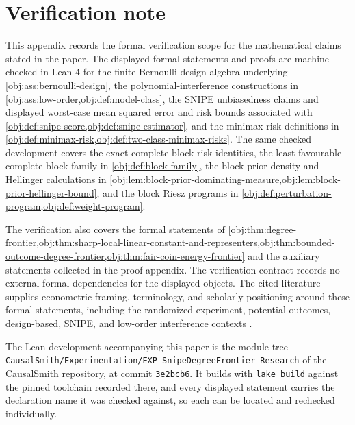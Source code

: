 \section{Verification note}

This appendix records the formal verification scope for the mathematical claims stated in the paper. The displayed formal statements and proofs are machine-checked in Lean 4 for the finite Bernoulli design algebra underlying \cref{obj:ass:bernoulli-design}, the polynomial-interference constructions in \cref{obj:ass:low-order,obj:def:model-class}, the SNIPE unbiasedness claims and displayed worst-case mean squared error and risk bounds associated with \cref{obj:def:snipe-score,obj:def:snipe-estimator}, and the minimax-risk definitions in \cref{obj:def:minimax-risk,obj:def:two-class-minimax-risks}. The same checked development covers the exact complete-block risk identities, the least-favourable complete-block family in \cref{obj:def:block-family}, the block-prior density and Hellinger calculations in \cref{obj:lem:block-prior-dominating-measure,obj:lem:block-prior-hellinger-bound}, and the block Riesz programs in \cref{obj:def:perturbation-program,obj:def:weight-program}.

The verification also covers the formal statements of \cref{obj:thm:degree-frontier,obj:thm:sharp-local-linear-constant-and-representers,obj:thm:bounded-outcome-degree-frontier,obj:thm:fair-coin-energy-frontier} and the auxiliary statements collected in the proof appendix. The verification contract records no external formal dependencies for the displayed objects. The cited literature supplies econometric framing, terminology, and scholarly positioning around these formal statements, including the randomized-experiment, potential-outcomes, design-based, SNIPE, and low-order interference contexts \citep{HorvitzThompson1952,Rubin1978,ImbensRubin2015,Aronow2017,CortezRodriguezEichhornYu2023,HarshawSavjeWang2025}.

The Lean development accompanying this paper is the module tree \texttt{CausalSmith/Experimentation/EXP\_SnipeDegreeFrontier\_Research} of the CausalSmith repository, at commit \texttt{3e2bcb6}. It builds with \texttt{lake build} against the pinned toolchain recorded there, and every displayed statement carries the declaration name it was checked against, so each can be located and rechecked individually.
